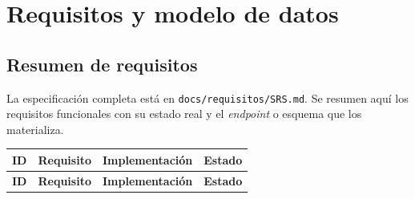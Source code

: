 \documentclass[11pt,a4paper]{article}
\newcommand{\ruta}[1]{\texttt{\footnotesize #1}}
\begin{document}
\section{Requisitos y modelo de datos}
\label{sec:requisitos}

\subsection{Resumen de requisitos}

La especificación completa está en \ruta{docs/requisitos/SRS.md}. Se resumen
aquí los requisitos funcionales con su estado real y el \emph{endpoint} o
esquema que los materializa.

\renewcommand{\arraystretch}{1.15}
\begin{longtable}{@{}p{1.3cm}p{7.4cm}p{4.6cm}p{1.7cm}@{}}
\toprule
\textbf{ID} & \textbf{Requisito} & \textbf{Implementación} & \textbf{Estado} \\
\midrule
\endfirsthead
\toprule
\textbf{ID} & \textbf{Requisito} & \textbf{Implementación} & \textbf{Estado} \\
\midrule
\endhead


\end{longtable}
\end{document}
